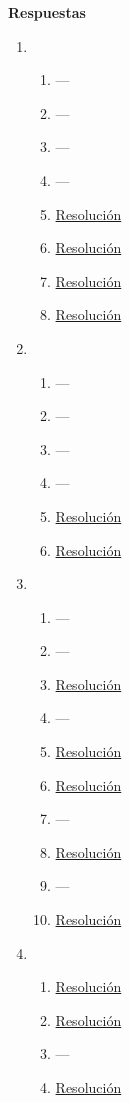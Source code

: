 \documentclass[a4paper]{article}
\newcommand{\exercise}{\item}
\begin{document}
 \textbf{Respuestas}\begin{enumerate}\exercise\begin{enumerate} [label=(\alph*)]\item ---\item ---\item ---\item ---		\item \href{https://youtu.be/DWDi7BKAKbc}{Resolución}
		\item \href{https://youtu.be/bfCWsvZfFq0}{Resolución}
		\item \href{https://youtu.be/W3HcTD4IC94}{Resolución}
		\item \href{https://youtu.be/0Dw3MAwrA34}{Resolución}
\end{enumerate}\exercise\begin{enumerate} [label=(\alph*)]\item ---\item ---\item ---\item ---		\item \href{https://youtu.be/09D5Z3dcaXc}{Resolución}
		\item \href{https://youtu.be/jE5a43IQ91E}{Resolución}
\end{enumerate}\exercise\begin{enumerate} [label=(\alph*)]\item ---\item ---		\item \href{https://youtu.be/ZMBXAdxOleM}{Resolución}
\item ---		\item \href{https://youtu.be/1V06bnuaadA}{Resolución}
		\item \href{https://youtu.be/Z1KatpJM2eU}{Resolución}
\item ---		\item \href{https://youtu.be/EQIEmdkGOZE}{Resolución}
\item ---		\item \href{https://youtu.be/BCo0pxE288w}{Resolución}
\end{enumerate}\exercise\begin{enumerate} [label=(\alph*)]		\item \href{https://youtu.be/_XVYatmUKBg}{Resolución}
		\item \href{https://youtu.be/LDpq_f-baPc}{Resolución}
\item ---		\item \href{https://youtu.be/LDpq_f-baPc}{Resolución}
\end{enumerate}\end{enumerate}
\end{document}
